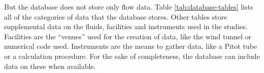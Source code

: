 But the database does not store only flow data.  Table
\ref{tab:database-tables} lists all of the categories of data that the database
stores.  Other tables store supplemental data on the fluids, facilities and
instruments used in the studies.  Facilities are the ``venues'' used for the
creation of data, like the wind tunnel or numerical code used.  Instruments are
the means to gather data, like a Pitot tube or a calculation procedure.  For
the sake of completeness, the database can include data on these when
available.

